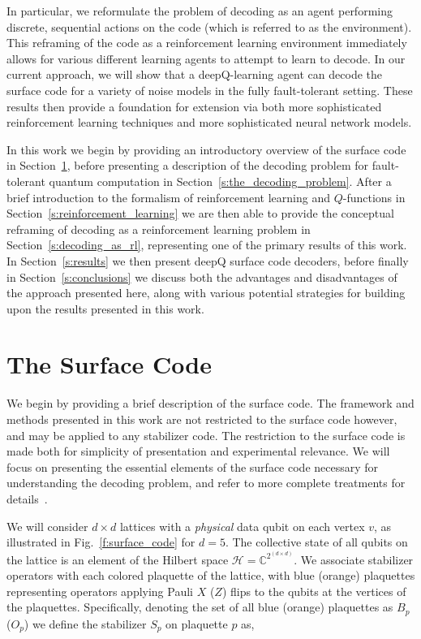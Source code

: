 \documentclass[twocolumn,preprintnumbers,amsmath,amssymb,notitlepage,nofootinbib,longbibliography,superscriptaddress,aps,pra,10pt]{revtex4-1}
\begin{document}
	In particular, we reformulate the problem of decoding as an agent performing discrete, sequential actions on the code (which is
	referred to as the environment).
	This reframing of the code as a reinforcement learning environment immediately allows for various different learning agents
	to attempt to learn to decode. In our current approach, we will show that a deepQ-learning agent can decode the surface code for
	a variety of noise models in the fully fault-tolerant setting.
	These results then provide a foundation for extension via both more sophisticated reinforcement learning techniques and
	more sophisticated neural network models.

	In this work we begin by providing an introductory overview of the surface code in Section~\ref{s:the_surface_code},
	before presenting a description of the decoding problem for fault-tolerant quantum computation in Section~\ref{s:the_decoding_problem}.
	After a brief introduction to the formalism of reinforcement learning and $Q$-functions in Section~\ref{s:reinforcement_learning} we
	are then able to provide the conceptual reframing of decoding as a reinforcement learning problem in Section~\ref{s:decoding_as_rl}, representing
	one of the primary results of this work.
	In Section~\ref{s:results} we then present deepQ surface code decoders, before finally in Section~\ref{s:conclusions} we
	discuss both the advantages and disadvantages of the approach presented here,
	along with various potential strategies for building upon the results presented in this work.

\section{The Surface Code}\label{s:the_surface_code}

	We begin by providing a brief description of the surface code.
	The framework and methods presented in this work are not restricted to the surface code however, and may be applied to any stabilizer code.
	The restriction to the surface code is made both for simplicity of presentation and experimental relevance.
	We will focus on presenting the essential elements of the surface code necessary for understanding the decoding problem, and refer to
	more complete treatments for details~\cite{a,b,c}.

	We will consider $d\times d$ lattices with a \textit{physical} data qubit on each vertex $v$, as illustrated in Fig.~\ref{f:surface_code} for $d=5$.
	The collective state of all qubits on the lattice is an element of the Hilbert space $\mathcal{H} = \mathbb{C}^{2^{(d\times d)}}$.
	We associate stabilizer operators with each colored plaquette of the lattice, with blue (orange) plaquettes representing operators
	applying Pauli $X$ ($Z$) flips to the qubits at the vertices of the plaquettes.
	Specifically, denoting the set of all blue (orange) plaquettes as $B_p$ ($O_p$) we define the stabilizer $S_p$ on plaquette $p$ as,
\end{document}

